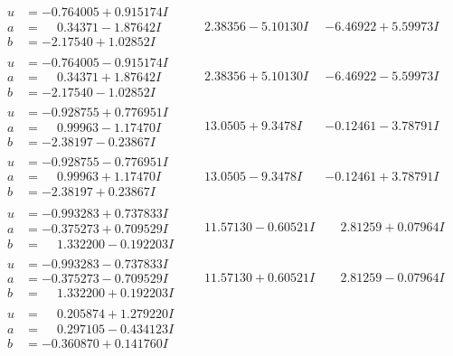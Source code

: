 \documentclass[1p]{elsarticle_modified}
\theoremstyle{definition}
\begin{document}
$$\begin{array}{c|c|c}
\begin{aligned}
u &= -0.764005 + 0.915174 I \\
a &= \phantom{-}0.34371 - 1.87642 I \\
b &= -2.17540 + 1.02852 I\end{aligned}
 & \phantom{-}2.38356 - 5.10130 I & -6.46922 + 5.59973 I \\ \hline\begin{aligned}
u &= -0.764005 - 0.915174 I \\
a &= \phantom{-}0.34371 + 1.87642 I \\
b &= -2.17540 - 1.02852 I\end{aligned}
 & \phantom{-}2.38356 + 5.10130 I & -6.46922 - 5.59973 I \\ \hline\begin{aligned}
u &= -0.928755 + 0.776951 I \\
a &= \phantom{-}0.99963 - 1.17470 I \\
b &= -2.38197 - 0.23867 I\end{aligned}
 & \phantom{-}13.0505 + 9.3478 I & -0.12461 - 3.78791 I \\ \hline\begin{aligned}
u &= -0.928755 - 0.776951 I \\
a &= \phantom{-}0.99963 + 1.17470 I \\
b &= -2.38197 + 0.23867 I\end{aligned}
 & \phantom{-}13.0505 - 9.3478 I & -0.12461 + 3.78791 I \\ \hline\begin{aligned}
u &= -0.993283 + 0.737833 I \\
a &= -0.375273 + 0.709529 I \\
b &= \phantom{-}1.332200 - 0.192203 I\end{aligned}
 & \phantom{-}11.57130 - 0.60521 I & \phantom{-}2.81259 + 0.07964 I \\ \hline\begin{aligned}
u &= -0.993283 - 0.737833 I \\
a &= -0.375273 - 0.709529 I \\
b &= \phantom{-}1.332200 + 0.192203 I\end{aligned}
 & \phantom{-}11.57130 + 0.60521 I & \phantom{-}2.81259 - 0.07964 I \\ \hline\begin{aligned}
u &= \phantom{-}0.205874 + 1.279220 I \\
a &= \phantom{-}0.297105 - 0.434123 I \\
b &= -0.360870 + 0.141760 I\end{aligned}

\end{array}$$
\end{document}
